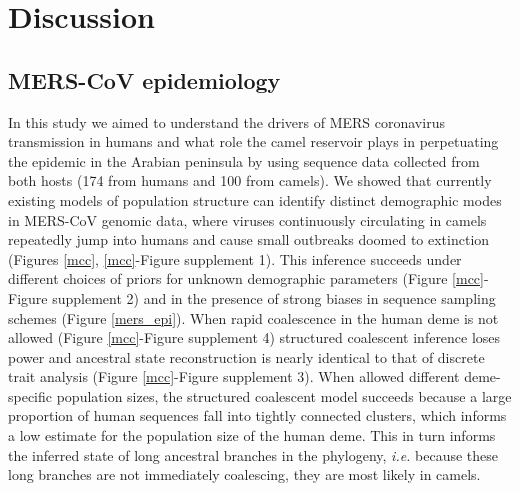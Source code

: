 \documentclass[9pt,lineno]{elife}
\def\lmc#1{\textcolor{green}{[#1]}}
\begin{document}
\section*{Discussion}

\subsection*{MERS-CoV epidemiology}
In this study we aimed to understand the drivers of MERS coronavirus transmission in humans and what role the camel reservoir plays in perpetuating the epidemic in the Arabian peninsula by using sequence data collected from both hosts (174 from humans and 100 from camels).
We showed that currently existing models of population structure \citep{vaughan_efficient_2014} can identify distinct demographic modes in MERS-CoV genomic data, where viruses continuously circulating in camels repeatedly jump into humans and cause small outbreaks doomed to extinction (Figures \ref{mcc}, \ref{mcc}-Figure supplement 1).
This inference succeeds under different choices of priors for unknown demographic parameters (Figure \ref{mcc}-Figure supplement 2) and in the presence of strong biases in sequence sampling schemes (Figure \ref{mers_epi}).
When rapid coalescence in the human deme is not allowed (Figure \ref{mcc}-Figure supplement 4) structured coalescent inference loses power and ancestral state reconstruction is nearly identical to that of discrete trait analysis (Figure \ref{mcc}-Figure supplement 3).
When allowed different deme-specific population sizes, the structured coalescent model succeeds because a large proportion of human sequences fall into tightly connected clusters, which informs a low estimate for the population size of the human deme.
This in turn informs the inferred state of long ancestral branches in the phylogeny, \textit{i.e.} because these long branches are not immediately coalescing, they are most likely in camels.
\end{document}
